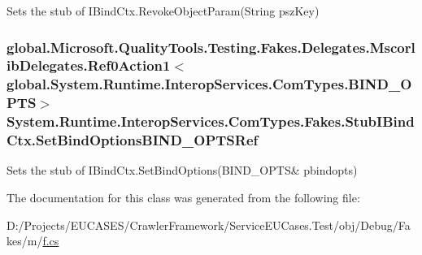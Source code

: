Sets the stub of I\-Bind\-Ctx.\-Revoke\-Object\-Param(\-String psz\-Key)

\hypertarget{class_system_1_1_runtime_1_1_interop_services_1_1_com_types_1_1_fakes_1_1_stub_i_bind_ctx_a334300112679790c4c2448cf7dab222b}{
\subsubsection[{Set\-Bind\-Options\-B\-I\-N\-D\-\_\-\-O\-P\-T\-S\-Ref}]{\setlength{\rightskip}{0pt plus 5cm}global.\-Microsoft.\-Quality\-Tools.\-Testing.\-Fakes.\-Delegates.\-Mscorlib\-Delegates.\-Ref0\-Action1$<$global.\-System.\-Runtime.\-Interop\-Services.\-Com\-Types.\-B\-I\-N\-D\-\_\-\-O\-P\-T\-S$>$ System.\-Runtime.\-Interop\-Services.\-Com\-Types.\-Fakes.\-Stub\-I\-Bind\-Ctx.\-Set\-Bind\-Options\-B\-I\-N\-D\-\_\-\-O\-P\-T\-S\-Ref}}\label{class_system_1_1_runtime_1_1_interop_services_1_1_com_types_1_1_fakes_1_1_stub_i_bind_ctx_a334300112679790c4c2448cf7dab222b}


Sets the stub of I\-Bind\-Ctx.\-Set\-Bind\-Options(B\-I\-N\-D\-\_\-\-O\-P\-T\-S\& pbindopts)



The documentation for this class was generated from the following file\-:\begin{DoxyCompactItemize}
\item 
D\-:/\-Projects/\-E\-U\-C\-A\-S\-E\-S/\-Crawler\-Framework/\-Service\-E\-U\-Cases.\-Test/obj/\-Debug/\-Fakes/m/\hyperlink{m_2f_8cs}{f.\-cs}\end{DoxyCompactItemize}
